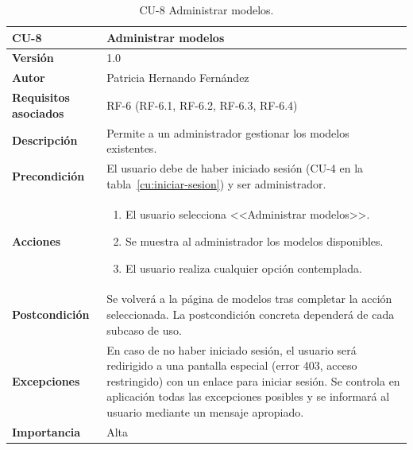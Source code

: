 \begin{table}[p]
	\centering
	\begin{tabularx}{\linewidth}{ p{} p{} }
		\toprule
		\textbf{CU-8}    & \textbf{Administrar modelos}\\
		\toprule
		\textbf{Versión}              & 1.0    \\
		\textbf{Autor}                & Patricia Hernando Fernández \\
		\textbf{Requisitos asociados} & RF-6 (RF-6.1, RF-6.2, RF-6.3, RF-6.4) \\
		\textbf{Descripción}          & Permite a un administrador gestionar los modelos existentes.\\
		\textbf{Precondición}         & El usuario debe de haber iniciado sesión (CU-4 en la tabla~\ref{cu:iniciar-sesion}) y ser administrador. \\
		\textbf{Acciones}             &
		\begin{enumerate}
			\def\labelenumi{\arabic{enumi}.}
			\tightlist
			\item El usuario selecciona <<Administrar modelos>>.
			\item Se muestra al administrador los modelos disponibles.
			\item El usuario realiza cualquier opción contemplada.
		\end{enumerate}\\
		\textbf{Postcondición}        & Se volverá a la página de modelos tras completar la acción seleccionada. La postcondición concreta dependerá de cada subcaso de uso. \\
		\textbf{Excepciones}          & En caso de no haber iniciado sesión, el usuario será redirigido a una pantalla especial (error 403, acceso restringido) con un enlace para iniciar sesión. Se controla en aplicación todas las excepciones posibles y se informará al usuario mediante un mensaje apropiado. \\
		\textbf{Importancia}          & Alta \\
		\bottomrule
	\end{tabularx}
	\caption{CU-8 Administrar modelos.}
	\label{cu:admin-modelos}
\end{table}

